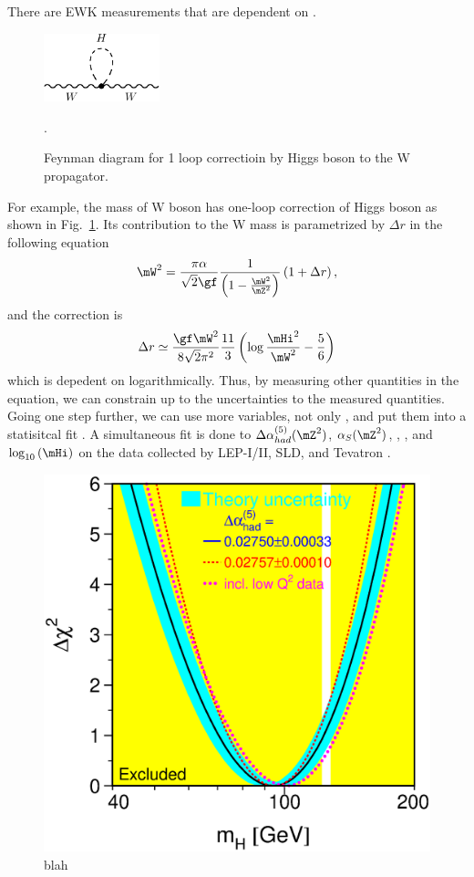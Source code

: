 There are EWK measurements that are dependent on \mHi. 
\begin{figure}[t]
\centering
\includegraphics[width=0.3\textwidth]{figures/FD_Wmass_Hloop.pdf}
\caption{Feynman diagram for 1 loop correctioin by Higgs boson to the W propagator.}.
\label{fig:FD_Wmass_Hloop}
\end{figure}
For example, the mass of W boson has one-loop correction of Higgs boson 
as shown in Fig.~\ref{fig:FD_Wmass_Hloop}. Its contribution to the W mass 
is parametrized by $\Delta r$ in the following equation 
\begin{eqnarray} 
\mW^2 
= 
\frac{\pi\alpha}{\sqrt{2} \gf} 
\frac{1}{\left( 1 - \frac{\mW^2}{\mZ^2} \right)} 
\left( 1 + \Delta r \right),
\end{eqnarray} 
and the correction is 
\begin{eqnarray}
\Delta r \simeq 
\frac{\gf \mW^2}{8 \sqrt{2} \pi^2} \frac{11}{3} 
\left( \log \frac{\mHi^2}{\mW^2} - \frac{5}{6} \right)
\end{eqnarray} 
which is depedent on \mHi{} logarithmically. Thus, by measuring other quantities 
in the equation, we can constrain \mHi{} up to the uncertainties to the measured 
quantities. Going one step further, we can use more variables, not only \mW, 
and put them into a statisitcal fit \cite{LEP-2}. A simultaneous fit is done to
$\Delta \alpha_{had}^{(5)}(\mZ^2)$, $\alpha_S(\mZ^2)$,  
\mZ, \mt, and  $\log_{10} \left( \mHi \right)$
on the data collected by LEP-I/II, SLD, and Tevatron \cite{LEP-2}.  
\begin{figure}[t]
\centering
\includegraphics[height=0.5\textheight]{figures/w12_blueband.eps}
\caption{blah}
\label{fig:EWKprecision}
\end{figure}
